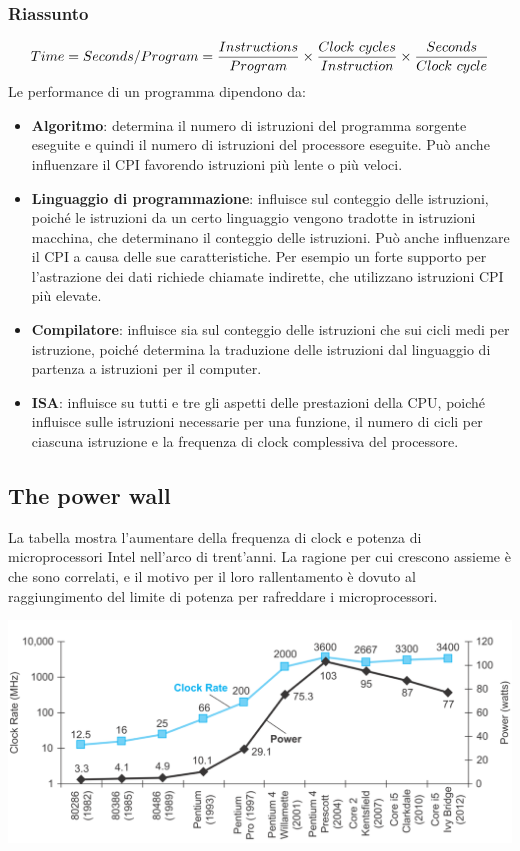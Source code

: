 \documentclass[12pt,a4paper]{article}
\begin{document}
\subsubsection{Riassunto}
$$Time = Seconds / Program = {Instructions \over Program} \times {Clock\ cycles \over Instruction} \times {Seconds \over Clock \ cycle}$$
Le performance di un programma dipendono da:
\begin{itemize}
\item \textbf{Algoritmo}: determina il numero di istruzioni del programma sorgente eseguite e quindi il numero di istruzioni del processore eseguite. Può anche influenzare il CPI favorendo istruzioni più lente o più veloci.
\item \textbf{Linguaggio di programmazione}: influisce sul conteggio delle istruzioni, poiché le istruzioni da un certo linguaggio vengono tradotte in istruzioni macchina, che determinano il conteggio delle istruzioni. Può anche influenzare il CPI a causa delle sue caratteristiche. Per esempio un forte supporto per l'astrazione dei dati richiede chiamate indirette, che utilizzano istruzioni CPI più elevate.
\item \textbf{Compilatore}: influisce sia sul conteggio delle istruzioni che sui cicli medi per istruzione, poiché determina la
traduzione delle istruzioni dal linguaggio di partenza a istruzioni per il computer.
\item \textbf{ISA}: influisce su tutti e tre gli aspetti delle prestazioni della CPU, poiché influisce sulle istruzioni necessarie per una
funzione, il numero di cicli per ciascuna istruzione e la frequenza di clock complessiva del processore.
\end{itemize}

\subsection{The power wall}
La tabella mostra l'aumentare della frequenza di clock e potenza di microprocessori Intel nell'arco di trent'anni. La ragione per cui crescono assieme è che sono correlati, e il motivo per il loro rallentamento è dovuto al raggiungimento del limite di potenza per rafreddare i microprocessori.
\begin{center}
\includegraphics[width=0.8\columnwidth]{img/powerwall.png}
\end{center}
\end{document}
